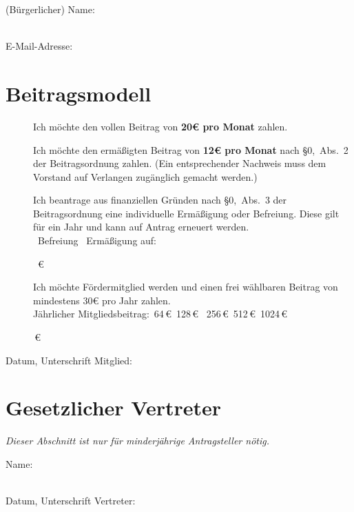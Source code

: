 \documentclass[a4paper,11pt]{scrartcl}
\newcommand{\signskip}{\rule{0pt}{24pt}}
\newcommand{\smallsignskip}{\rule{0pt}{16pt}}
\newcommand{\hinweis}[1]{\emph{#1}}
\begin{document}
(Bürgerlicher) Name: \hrulefill \smallsignskip \\
E-Mail-Adresse: \hrulefill \signskip

\section*{Beitragsmodell}
\begin{description}
  \item[\Square] Ich möchte den vollen Beitrag von \textbf{20€ pro Monat} zahlen.
  \item[\Square] Ich möchte den ermäßigten Beitrag von \textbf{12€ pro Monat}
    nach §0,~Abs.~2 der Beitragsordnung zahlen. (Ein entsprechender Nachweis
    muss dem Vorstand auf Verlangen zugänglich gemacht werden.)
  \item[\Square] Ich beantrage aus finanziellen Gründen nach §0,~Abs.~3 der
    Beitragsordnung eine individuelle Ermäßigung oder Befreiung. Diese gilt für
    ein Jahr und kann auf Antrag erneuert werden. \\
    \Square~Befreiung \hfill
    \Square~Ermäßigung auf: \hrulefill\signskip~€\hfill\phantom{a}
\end{description}

\begin{description}
  \item[\Square] Ich möchte Fördermitglied werden und einen frei wählbaren
    Beitrag von mindestens 30€ pro Jahr zahlen. \\
    Jährlicher Mitgliedsbeitrag:\quad \Square~64\,€\quad \Square~128\,€\quad
      \Square~256\,€\quad \Square~512\,€\quad \Square~1024\,€\quad
      \Square~\hrulefill\signskip\,€
\end{description}
Datum, Unterschrift Mitglied: \hrulefill\smallsignskip

\section*{Gesetzlicher Vertreter}
\hinweis{Dieser Abschnitt ist nur für minderjährige Antragsteller nötig.}

Name: \hrulefill \signskip \\
Datum, Unterschrift Vertreter: \hrulefill \signskip
\end{document}
